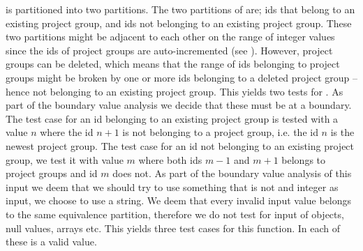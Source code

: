 \vargroupid{} is partitioned into two partitions.
The two partitions of \vargroupid{} are; ids that belong to an existing project group, and ids not belonging to an existing project group.
These two partitions might be adjacent to each other on the range of integer values since the ids of project groups are auto-incremented (see ).
However, project groups can be deleted, which means that the range of ids belonging to project groups might be broken by one or more ids belonging to a deleted project group -- hence not belonging to an existing project group.
This yields two tests for \vargroupid{}.
As part of the boundary value analysis we decide that these must be at a boundary.
The test case for an id belonging to an existing project group is tested with a value $n$ where the id $n+1$ is not belonging to a project group, i.e. the id $n$ is the newest project group.
The test case for an id not belonging to an existing project group, we test it with value $m$ where both ids $m-1$ and $m+1$ belongs to project groups and id $m$ does not.
As part of the boundary value analysis of this input we deem that we should try to use something that is not and integer as input, we choose to use a string.
We deem that every invalid input value belongs to the same equivalence partition, therefore we do not test for input of objects, null values, arrays etc.
This yields three test cases for this function.
In each of these \varuserids{} is a valid value.

